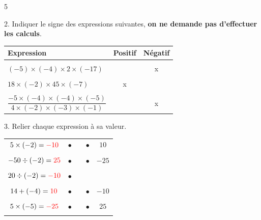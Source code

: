 \documentclass[a4paper]{book}
\begin{document}
{\begin{exerciceNote}{5}
\begin{enumerate}[leftmargin=*]
            \begin{minipage}[b]{0.45\linewidth}
                2. Indiquer le signe des expressions suivantes, \textbf{on ne demande pas d'effectuer les calculs}.

                \medskip
    
                \begin{tabular}{|l|c|c|}
                    \hline
                    Expression & Positif & Négatif\\[2ex] 
                    \hline & & \\
                    $(-5)\times(-4)\times2\times(-17)$ & & x \\[2ex] 
                    \hline & &\\
                    $18\times(-2)\times45\times(-7)$ & x & \\[2ex]
                    \hline & &\\
                    $\dfrac{-5\times(-4)\times(-4)\times(-5)}{4\times(-2)\times(-3)\times(-1)}$ & & x\\[2ex]
                    \hline
                \end{tabular}
            \end{minipage}
            \hfill \vline\hfill
            \begin{minipage}{0.45\linewidth}
                3. Relier chaque expression à sa valeur.

                \bigskip

                \begin{tabular}{ccp{1cm}cc}
                    $5\times(-2)=\textcolor{red}{-10}$   & $\bullet$   & & $\bullet$ & $10$ \\ \\

                    $-50\div(-2)=\textcolor{red}{25}$    & $\bullet$   & & $\bullet$ & $-25$ \\ \\

                    $20\div(-2)=\textcolor{red}{-10}$    & $\bullet$   & &  \\ \\

                    $14+(-4)=\textcolor{red}{10}$        & $\bullet$   & & $\bullet$ & $-10$  \\ \\

                    $5\times(-5)=\textcolor{red}{-25}$   & $\bullet$   & & $\bullet$ & $25$ \\ \\
                \end{tabular}


\end{minipage}
\end{enumerate}
\end{exerciceNote}}
\end{document}
